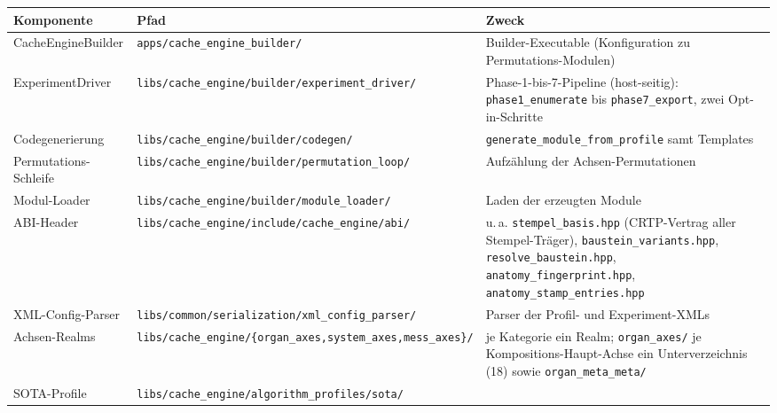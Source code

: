 {\small
\begin{longtable}{@{}>{\raggedright\arraybackslash}p{}>{\raggedright\arraybackslash}p{}>{\raggedright\arraybackslash}p{}@{}}
\toprule
\textbf{Komponente} & \textbf{Pfad} & \textbf{Zweck} \\
\midrule
\endhead%
\midrule
\endfoot%
\bottomrule
\endlastfoot%
CacheEngineBuilder &
\texttt{apps/\allowbreak{}cache\_engine\_builder/} &
Builder-Executable (Konfiguration zu Permutations-Modulen) \\
ExperimentDriver &
\texttt{libs/\allowbreak{}cache\_engine/\allowbreak{}builder/\allowbreak{}experiment\_driver/} &
Phase-1-bis-7-Pipeline (host-seitig): \texttt{phase1\_\allowbreak{}enumerate} bis
\texttt{phase7\_\allowbreak{}export}, zwei Opt-in-Schritte \\
Codegenerierung &
\texttt{libs/\allowbreak{}cache\_engine/\allowbreak{}builder/\allowbreak{}codegen/} &
\texttt{generate\_\allowbreak{}module\_\allowbreak{}from\_\allowbreak{}profile} samt Templates \\
Permutations-Schleife &
\texttt{libs/\allowbreak{}cache\_engine/\allowbreak{}builder/\allowbreak{}permutation\_loop/} &
Aufzählung der Achsen-Permutationen \\
Modul-Loader &
\texttt{libs/\allowbreak{}cache\_engine/\allowbreak{}builder/\allowbreak{}module\_loader/} &
Laden der erzeugten Module \\
ABI-Header &
\texttt{libs/\allowbreak{}cache\_engine/\allowbreak{}include/\allowbreak{}cache\_engine/\allowbreak{}abi/} &
u.\,a. \texttt{stempel\_\allowbreak{}basis.hpp} (CRTP-Vertrag aller Stempel-Träger),
\texttt{baustein\_\allowbreak{}variants.hpp}, \texttt{resolve\_\allowbreak{}baustein.hpp},
\texttt{anatomy\_\allowbreak{}fingerprint.hpp}, \texttt{anatomy\_\allowbreak{}stamp\_\allowbreak{}entries.hpp} \\
XML-Config-Parser &
\texttt{libs/\allowbreak{}common/\allowbreak{}serialization/\allowbreak{}xml\_config\_parser/} &
Parser der Profil- und Experiment-XMLs \\
Achsen-Realms &
\texttt{libs/\allowbreak{}cache\_engine/\allowbreak{}\{organ\_axes,\allowbreak{}system\_axes,\allowbreak{}mess\_axes\}/} &
je Kategorie ein Realm; \texttt{organ\_\allowbreak{}axes/} je Kompositions-Haupt-Achse ein
Unterverzeichnis (18) sowie \texttt{organ\_\allowbreak{}meta\_\allowbreak{}meta/} \\
SOTA-Profile &
\texttt{libs/\allowbreak{}cache\_engine/\allowbreak{}algorithm\_profiles/\allowbreak{}sota/} &

\end{longtable}}
